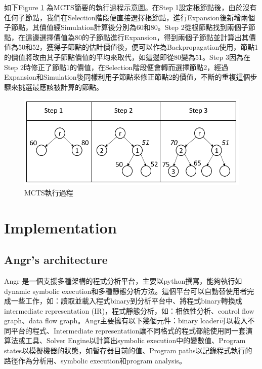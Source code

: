 \documentclass[12pt,a4paper,oneside]{book}
\begin{document}
如下Figure \ref{figStep} 為MCTS簡要的執行過程示意圖。在Step 1設定根節點後，由於沒有任何子節點，我們在Selection階段便直接選擇根節點，進行Expansion後新增兩個子節點，其價值經Simulation計算後分別為60和80。Step 2從根節點找到兩個子節點，在這邊選擇價值為80的子節點進行Expansion，得到兩個子節點並計算出其價值為50和52，獲得子節點的估計價值後，便可以作為Backpropagation使用，節點1的價值將改由其子節點價值的平均來取代，如這邊即從80變為51。Step 3因為在Step 2時修正了節點1的價值，在Selection階段便會轉而選擇節點2，經過Expansion和Simulation後同樣利用子節點來修正節點2的價值，不斷的重複這個步驟來挑選最應該被計算的節點。

\begin{figure}[htbp]
\center
\includegraphics[width=\textwidth]{figures/step.PNG}
\caption{MCTS執行過程 \label{figStep}}
\end{figure}

\chapter{Implementation}

\section{Angr's architecture}

Angr\cite{angr} 是一個支援多種架構的程式分析平台，主要以python撰寫，能夠執行如dynamic symbolic execution和多種靜態分析方法。這個平台可以自動替使用者完成一些工作，如：讀取並載入程式binary到分析平台中、將程式binary轉換成intermediate representation (IR)，程式靜態分析，如：相依性分析、control flow graph、data flow graph。Angr主要擁有以下幾個元件：binary loader可以載入不同平台的程式、Intermediate representation讓不同格式的程式都能使用同一套演算法或工具、Solver Engine以計算出symbolic execution中的變數值、Program states以模擬機器的狀態，如暫存器目前的值、Program paths以記錄程式執行的路徑作為分析用、symbolic execution和program analysis。
\end{document}
